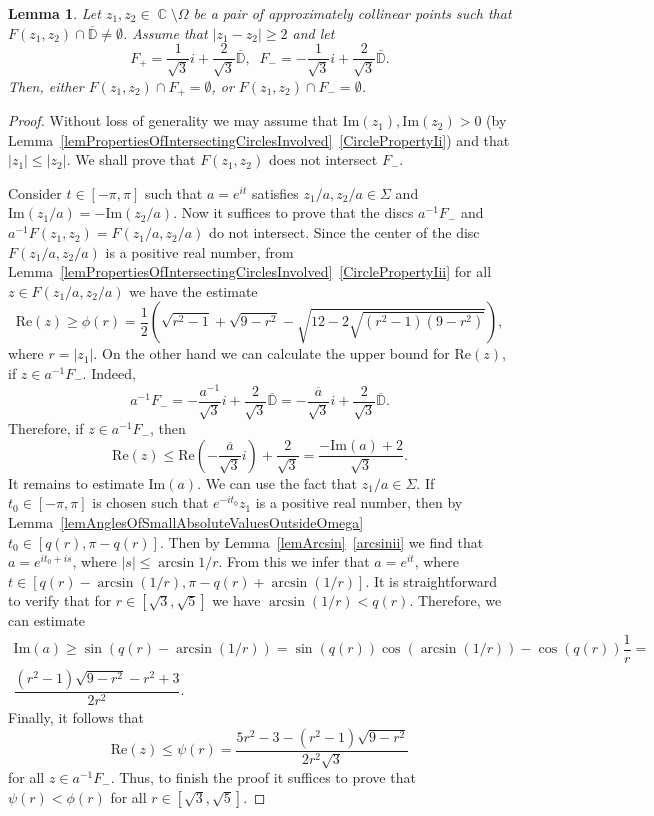 \documentclass{amsart}
\numberwithin{equation}{section}
\newtheorem{lemma}[theorem]{Lemma}
\theoremstyle{definition}
\theoremstyle{remark}
\DeclareMathOperator{\CC}{\mathbb C}
\begin{document}
	\begin{lemma}\label{lemDeformedUnitCircle}
		Let $z_1,z_2 \in \CC \setminus \Omega$ be a pair of approximately collinear points such that $F(z_1,z_2) \cap \overline{\mathbb D} \ne \emptyset$. Assume that $|z_1 - z_2| \ge 2$ and let
		\[
		F_+ = \dfrac{1}{\sqrt{3}}i + \dfrac{2}{\sqrt{3}} \overline{\mathbb D},\;\;F_- = -\dfrac{1}{\sqrt{3}}i + \dfrac{2}{\sqrt{3}} \overline{\mathbb D}.
		\]
		Then, either $F(z_1,z_2) \cap F_+ = \emptyset$, or $F(z_1,z_2) \cap F_- = \emptyset$.
	\end{lemma}
	\begin{proof}
		Without loss of generality we may assume that $\mathrm{Im}(z_1), \mathrm{Im}(z_2) > 0$ (by Lemma~\ref{lemPropertiesOfIntersectingCirclesInvolved}~\ref{CirclePropertyIi}) and that $|z_1| \le |z_2|$. We shall prove that $F(z_1,z_2)$ does not intersect $F_-$.
		
		Consider $t \in [-\pi, \pi]$ such that $a = e^{it}$ satisfies $z_1/a,z_2/a \in \Sigma$ and $\mathrm{Im}(z_1/a)  = -\mathrm{Im}(z_2/a)$. Now it suffices to prove that the discs $a^{-1}F_-$ and $a^{-1}F(z_1, z_2) = F(z_1/a, z_2/a)$ do not intersect. Since the center of the disc $F(z_1/a, z_2/a)$ is a positive real number, from Lemma~\ref{lemPropertiesOfIntersectingCirclesInvolved}~\ref{CirclePropertyIii} for all $z \in F(z_1/a, z_2/a)$ we have the estimate
		\[
		\mathrm{Re}(z) \ge \phi(r) = \dfrac{1}{2}\left(\sqrt{r^2 - 1} + \sqrt{9 - r^2} - \sqrt{12 -2\sqrt{(r^2 - 1)(9 - r^2)}}\right),
		\]
		where $r = |z_1|$. On the other hand we can calculate the upper bound for $\mathrm{Re}(z)$, if $z \in a^{-1}F_-$. Indeed, 
		\[
		a^{-1}F_- = -\dfrac{a^{-1}}{\sqrt{3}}i + \dfrac{2}{\sqrt{3}}\overline{\mathbb D} = -\dfrac{\overline{a}}{\sqrt{3}}i + \dfrac{2}{\sqrt{3}}\overline{\mathbb D}.\]
		Therefore, if $z \in a^{-1}F_-$, then
		\[
		\mathrm{Re}(z) \le \mathrm{Re}\left(-\dfrac{\overline{a}}{\sqrt{3}}i\right) + \dfrac{2}{\sqrt{3}} = \dfrac{-\mathrm{Im}(a) + 2}{\sqrt{3}}.
		\]
		It remains to estimate $\mathrm{Im}(a)$. We can use the fact that $z_1/a \in \Sigma$. If $t_0 \in [-\pi, \pi]$ is chosen such that $e^{-it_0}z_1$ is a positive real number, then by Lemma~\ref{lemAnglesOfSmallAbsoluteValuesOutsideOmega} $t_0 \in [q(r), \pi - q(r)]$. Then by Lemma~\ref{lemArcsin}~\ref{arcsinii} we find that $a = e^{it_0 + is}$, where $|s| \le \arcsin{1/r}$. From this we infer that $a = e^{it}$, where $t \in [q(r) - \arcsin(1/r), \pi - q(r) + \arcsin(1/r)]$. It is straightforward to verify that for $r \in [\sqrt{3}, \sqrt{5}]$ we have $\arcsin(1/r) < q(r)$. Therefore, we can estimate
		\begin{multline*}
			\mathrm{Im}(a) \ge \sin(q(r) - \arcsin(1/r)) = \sin(q(r))\cos(\arcsin(1/r)) - \cos(q(r))\dfrac{1}{r} = \\ \dfrac{(r^2 - 1)\sqrt{9 - r^2} - r^2 + 3}{2r^2}.
		\end{multline*}
		Finally, it follows that
		\[
		\mathrm{Re}(z) \le \psi(r) = \dfrac{5r^2 - 3 - (r^2 - 1)\sqrt{9 - r^2}}{2r^2\sqrt{3}}
		\]
		for all $z \in a^{-1}F_-$. Thus, to finish the proof it suffices to prove that $\psi(r) < \phi(r)$ for all $r \in [\sqrt{3}, \sqrt{5}]$.
		

\end{proof}
\end{document}

